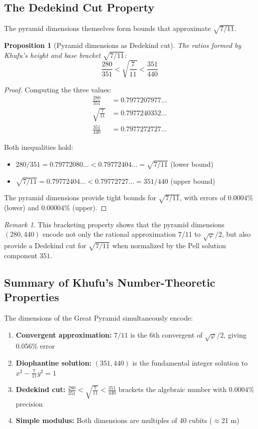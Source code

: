 \documentclass[11pt]{article}
\newtheorem{proposition}[theorem]{Proposition}
\theoremstyle{definition}
\theoremstyle{remark}
\newtheorem{remark}[theorem]{Remark}
\begin{document}
\subsection{The Dedekind Cut Property}

The pyramid dimensions themselves form bounds that approximate $\sqrt{7/11}$.

\begin{proposition}[Pyramid dimensions as Dedekind cut]
The ratios formed by Khufu's height and base bracket $\sqrt{7/11}$:
\[
\frac{280}{351} < \sqrt{\frac{7}{11}} < \frac{351}{440}
\]
\end{proposition}

\begin{proof}
Computing the three values:
\begin{align*}
\frac{280}{351} &= 0.7977207977\ldots \\
\sqrt{\frac{7}{11}} &= 0.7977240352\ldots \\
\frac{351}{440} &= 0.7977272727\ldots
\end{align*}

Both inequalities hold:
\begin{itemize}
\item $280/351 = 0.79772080\ldots < 0.79772404\ldots = \sqrt{7/11}$ (lower bound)
\item $\sqrt{7/11} = 0.79772404\ldots < 0.79772727\ldots = 351/440$ (upper bound)
\end{itemize}

The pyramid dimensions provide tight bounds for $\sqrt{7/11}$, with errors of $0.0004\%$ (lower) and $0.00004\%$ (upper).
\end{proof}

\begin{remark}
This bracketing property shows that the pyramid dimensions $(280, 440)$ encode not only the rational approximation $7/11$ to $\sqrt{\varphi}/2$, but also provide a Dedekind cut for $\sqrt{7/11}$ when normalized by the Pell solution component $351$.
\end{remark}

\subsection{Summary of Khufu's Number-Theoretic Properties}

The dimensions of the Great Pyramid simultaneously encode:

\begin{enumerate}
\item \textbf{Convergent approximation:} $7/11$ is the 6th convergent of $\sqrt{\varphi}/2$, giving 0.056\% error
\item \textbf{Diophantine solution:} $(351, 440)$ is the fundamental integer solution to $x^2 - \frac{7}{11}y^2 = 1$
\item \textbf{Dedekind cut:} $\frac{280}{351} < \sqrt{\frac{7}{11}} < \frac{351}{440}$ brackets the algebraic number with $0.0004\%$ precision
\item \textbf{Simple modulus:} Both dimensions are multiples of 40 cubits ($\approx$21 m)
\end{enumerate}
\end{document}
